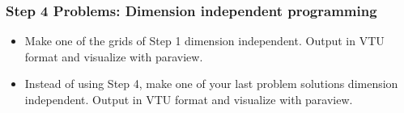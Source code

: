 \begin{frame}
  \frametitle{Step 4 Problems: Dimension independent programming}

  \begin{itemize}
  \item Make one of the grids of Step 1 dimension independent. Output in VTU format and visualize with paraview.
  \item Instead of using Step 4, make one of your last problem solutions dimension independent. Output in VTU format and visualize with paraview.
  \end{itemize}
\end{frame}
